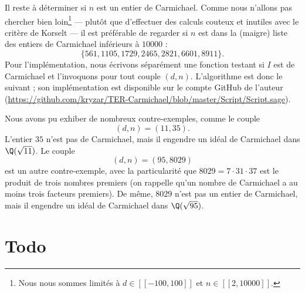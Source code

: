 \documentclass[a4paper, 12pt, oneside]{article}
\begin{document}
\begin{appendix}
Il reste à déterminer si $n$ est un entier de Carmichael. Comme nous n'allons pas chercher bien loin\footnote{Nous nous sommes limités à $d\in [\![-100, 100]\!]$ et $n\in [\![2, 10000]\!]$.} — plutôt que d'effectuer des calculs couteux et inutiles avec le critère de Korselt — il est préférable de regarder si $n$ est dans la (maigre) liste des entiers de Carmichael inférieurs à $10000$ : $$\{561, 1105, 1729, 2465, 2821, 6601, 8911\}.$$ Pour l'implémentation, nous écrivons séparément une fonction testant si $I$ est de Carmichael et l'invoquons pour tout couple $(d, n)$. L'algorithme est donc le suivant ; son implémentation est disponible sur le compte GitHub de l'auteur (\url{https://github.com/kryzar/TER-Carmichael/blob/master/Script/Script.sage}).

\vspace{1em}
\begin{algorithm}[H]
\end{algorithm}
\vspace{1em}

Nous avons pu exhiber de nombreux contre-exemples, comme le couple $$(d, n) = (11, 35).$$ L'entier $35$ n'est pas de Carmichael, mais il engendre un idéal de Carmichael dans $\Q(\sqrt{11})$. Le couple $$(d, n) = (95,8029)$$ est un autre contre-exemple, avec la particularité que $8029 = 7\cdot 31\cdot 37$ est le produit de trois nombres premiers (on rappelle qu'un nombre de Carmichael a au moins trois facteurs premiers). De même, $8029$ n'est pas un entier de Carmichael, mais il engendre un idéal de Carmichael dans $\Q(\sqrt{95})$.

\end{appendix}

\section{Todo}

\nocite{*}
\printbibliography
\end{document}
